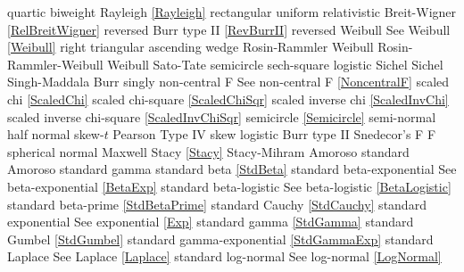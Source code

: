 quartic							\dotfill	biweight							\ncite
%
Rayleigh  						\dotfill	\eqref{Rayleigh}					\ncite	%
rectangular						\dotfill	uniform 							\ncite	%
relativistic Breit-Wigner		\dotfill	\eqref{RelBreitWigner}				\ncite	%
reversed Burr type II			\dotfill	\eqref{RevBurrII} 					\ncite	%
reversed Weibull				\dotfill	See Weibull \eqref{Weibull}			\ncite	%
right triangular				\dotfill	ascending wedge 					\ncite	%
Rosin-Rammler 					\dotfill	Weibull								   		%
Rosin-Rammler-Weibull 			\dotfill	Weibull								\ncite	%
%
Sato-Tate						\dotfill	semicircle 							\ncite	%
sech-square 					\dotfill	logistic							\ncite	%
Sichel							\dotfill	Sichel								\ncite	
Singh-Maddala 					\dotfill	Burr 								\ncite	%
singly non-central F       		\dotfill	See non-central F  \eqref{NoncentralF}	\ncite 
scaled chi						\dotfill	\eqref{ScaledChi}					\ncite	%
scaled chi-square 				\dotfill	\eqref{ScaledChiSqr}				\ncite	%
scaled inverse chi 				\dotfill	\eqref{ScaledInvChi}				\ncite	%
scaled inverse chi-square 		\dotfill	\eqref{ScaledInvChiSqr}				 	%
semicircle						\dotfill	\eqref{Semicircle}					\ncite	%
semi-normal 					\dotfill	half normal 						\ncite	%
skew-$t$						\dotfill	Pearson Type IV 					\ncite	%
skew logistic					\dotfill	Burr type II 						\ncite	%
Snedecor's F  					\dotfill	F 									\ncite	%
spherical normal				\dotfill	Maxwell								\ncite	%
Stacy 							\dotfill	\eqref{Stacy} 						\ncite	%
Stacy-Mihram					\dotfill	Amoroso								\ncite	%
standard Amoroso				\dotfill	standard gamma 						\ncite	%
standard beta					\dotfill	\eqref{StdBeta} 					\ncite	%
standard beta-exponential		\dotfill	See beta-exponential \eqref{BetaExp}	\ncite	%
standard beta-logistic			\dotfill	See beta-logistic \eqref{BetaLogistic}		\ncite	%
standard beta-prime				\dotfill	\eqref{StdBetaPrime}				\ncite	%
standard Cauchy					\dotfill	\eqref{StdCauchy} 					\ncite	%
standard exponential			\dotfill	See exponential \eqref{Exp} 		\ncite	%
standard gamma 					\dotfill	\eqref{StdGamma} 					\ncite	%
standard Gumbel 				\dotfill	\eqref{StdGumbel} 					\ncite	%
standard gamma-exponential		\dotfill	\eqref{StdGammaExp} 				\ncite	%
standard Laplace				\dotfill	See Laplace \eqref{Laplace}			\ncite	%
standard log-normal				\dotfill	See log-normal \eqref{LogNormal} 	\ncite	%
